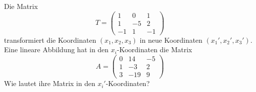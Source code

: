 %
%
%
%
%
Die Matrix
\[
T=
\begin{pmatrix}
   1&  0&  1\\
   1& -5&  2\\
  -1&  1& -1
\end{pmatrix}
\]
transformiert die Koordinaten $(x_1,x_2,x_3)$ in neue Koordinaten $(x_1',x_2',x_3')$.
Eine lineare Abbildung hat in den $x_i$-Koordinaten die Matrix
\[
A=
\begin{pmatrix}
    0&  14&  -5\\
    1&  -3&   2\\
    3& -19&   9
\end{pmatrix}
\]
Wie lautet ihre Matrix in den $x_i'$-Koordinaten?


